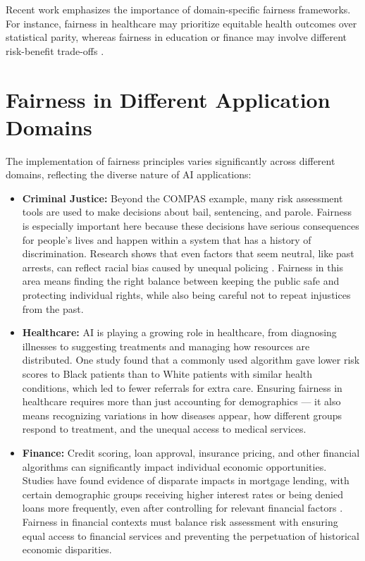 \documentclass[12pt,a4paper,openright,twoside]{book}
\begin{document}
Recent work emphasizes the importance of domain-specific fairness frameworks. For instance, fairness in healthcare may prioritize equitable health outcomes over statistical parity, whereas fairness in education or finance may involve different risk-benefit trade-offs \cite{mehrabi2021survey}.


\section{Fairness in Different Application Domains}
The implementation of fairness principles varies significantly across different domains, reflecting the diverse nature of AI applications:

\begin{itemize}
    \item\textbf{Criminal Justice:} Beyond the COMPAS example, many risk assessment tools are used to make decisions about bail, sentencing, and parole. Fairness is especially important here because these decisions have serious consequences for people’s lives and happen within a system that has a history of discrimination. Research shows that even factors that seem neutral, like past arrests, can reflect racial bias caused by unequal policing \cite{berk2017fairness, ensign2018runaway}. Fairness in this area means finding the right balance between keeping the public safe and protecting individual rights, while also being careful not to repeat injustices from the past.
    
    \item \textbf{Healthcare:} AI is playing a growing role in healthcare, from diagnosing illnesses to suggesting treatments and managing how resources are distributed. One study \cite{obermeyer2019dissecting} found that a commonly used algorithm gave lower risk scores to Black patients than to White patients with similar health conditions, which led to fewer referrals for extra care. Ensuring fairness in healthcare requires more than just accounting for demographics — it also means recognizing variations in how diseases appear, how different groups respond to treatment, and the unequal access to medical services.
    
    \item \textbf{Finance:} Credit scoring, loan approval, insurance pricing, and other financial algorithms can significantly impact individual economic opportunities. Studies have found evidence of disparate impacts in mortgage lending, with certain demographic groups receiving higher interest rates or being denied loans more frequently, even after controlling for relevant financial factors \cite{bartlett2022consumer}. Fairness in financial contexts must balance risk assessment with ensuring equal access to financial services and preventing the perpetuation of historical economic disparities.
    

\end{itemize}
\end{document}
